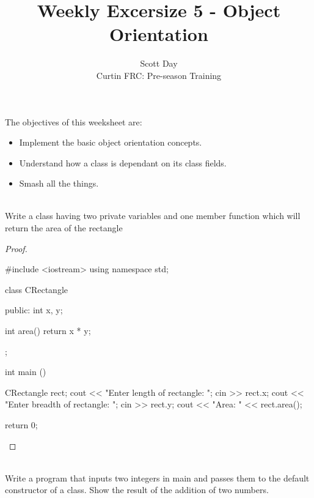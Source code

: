 \documentclass[12pt]{article}
\newenvironment{problem}[2][Problem]{\begin{trivlist}
\item[\hskip \labelsep {\bfseries #1}\hskip \labelsep {\bfseries #2.}]}{\end{trivlist}}
\begin{document}
\title{Weekly Excersize 5 - Object Orientation}
\author{Scott Day\\
Curtin FRC: Pre-season Training}

\maketitle


\begin{flushleft}
The objectives of this weeksheet are:

\begin{itemize}
    \item Implement the basic object orientation concepts.
    \item Understand how a class is dependant on its class fields.
    \item Smash all the things.
\end{itemize}
\end{flushleft}


\begin{problem}{1}
\text{ }\\
Write a class having two private variables and one member function which will return the area of the rectangle
\end{problem}

\begin{proof}
\begin{cppcode}[]
#include <iostream>
using namespace std;

class CRectangle
{
    public:
        int x, y;

        int area()
        {
            return x * y;
        }
};

int main ()
{
    CRectangle rect;
    cout << "Enter length of rectangle: ";
    cin >> rect.x;
    cout << "Enter breadth of rectangle: ";
    cin >> rect.y;
    cout << "Area: " << rect.area();

    return 0;
}
\end{cppcode}
\end{proof}
\pagebreak


\begin{problem}{2}
\text{ }\\
Write a program that inputs two integers in main and passes them to the default constructor of a class. Show the result of the addition of two numbers.
\end{problem}
\end{document}
